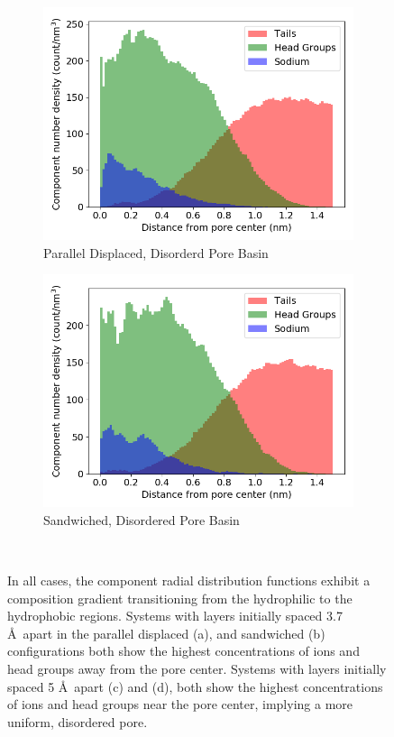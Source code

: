 \documentclass[journal=jpcbfk,manusciprt=article]{achemso}
\begin{document}
\begin{figure}
\begin{subfigure}{0.47\textwidth}
        \includegraphics[width=1\linewidth]{disordered_offset_density.png}
        \caption{Parallel Displaced, Disorderd Pore Basin}
        \label{fig:disordered_offset_density}
  \end{subfigure}
  \begin{subfigure}{0.47\textwidth}
        \includegraphics[width=1\linewidth]{disordered_density.png}
        \caption{Sandwiched, Disordered Pore Basin}
        \label{fig:disorder_layered_density}
  \end{subfigure}
  \caption{In all cases, the component radial distribution functions exhibit a
	  composition gradient transitioning from the hydrophilic to the hydrophobic
	  regions. Systems with layers initially spaced 3.7 \AA~apart in the  parallel
	  displaced (a), and sandwiched (b) configurations both show the highest
	  concentrations of ions and head groups away from the pore center. Systems with
	  layers initially spaced 5 \AA~apart (c) and (d), both show the highest
	  concentrations of ions and head groups near the pore center, implying a more
	  uniform, disordered pore.}~\label{fig:densities}
  \end{figure}
\end{document}
